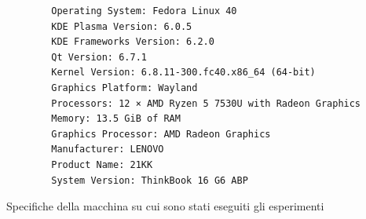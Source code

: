 \documentclass[conference]{IEEEtran}
\begin{document}
\begin{listing*}
    \begin{verbatim}
        Operating System: Fedora Linux 40
        KDE Plasma Version: 6.0.5
        KDE Frameworks Version: 6.2.0
        Qt Version: 6.7.1
        Kernel Version: 6.8.11-300.fc40.x86_64 (64-bit)
        Graphics Platform: Wayland
        Processors: 12 × AMD Ryzen 5 7530U with Radeon Graphics
        Memory: 13.5 GiB of RAM
        Graphics Processor: AMD Radeon Graphics
        Manufacturer: LENOVO
        Product Name: 21KK
        System Version: ThinkBook 16 G6 ABP
    \end{verbatim}
    \caption{Specifiche della macchina su cui sono stati eseguiti gli esperimenti}
    \label{listing:trials_machine_specs}
\end{listing*}
\end{document}
